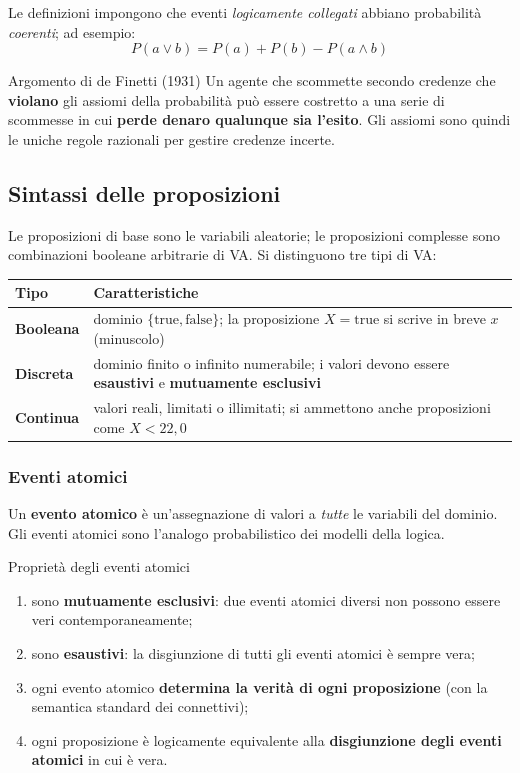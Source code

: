 \documentclass[11pt, a4paper]{article}
\renewcommand{\emph}[1]{\textcolor{verdechiaro}{\itshape #1}}
\newcommand{\intest}[1]{\textcolor{verde}{\sffamily\bfseries #1}}
\begin{document}
Le definizioni impongono che eventi \emph{logicamente collegati} abbiano probabilità \emph{coerenti}; ad esempio:
\[
  P(a \lor b) = P(a) + P(b) - P(a \land b)
\]

\begin{chiave}{Argomento di de Finetti (1931)}
  Un agente che scommette secondo credenze che \textbf{violano} gli assiomi della probabilità può essere costretto a una serie di scommesse in cui \textbf{perde denaro qualunque sia l'esito}. Gli assiomi sono quindi le uniche regole razionali per gestire credenze incerte.
\end{chiave}

\subsection{Sintassi delle proposizioni}

Le proposizioni di base sono le variabili aleatorie; le proposizioni complesse sono combinazioni booleane arbitrarie di VA. Si distinguono tre tipi di VA:

\begin{center}
  \renewcommand{\arraystretch}{1.35}
  \begin{tabular}{>{\bfseries}l p{10.6cm}}
    \toprule
    \intest{Tipo} & \intest{Caratteristiche} \\
    \midrule
    Booleana & dominio $\{\text{true}, \text{false}\}$; la proposizione $X = \text{true}$ si scrive in breve $x$ (minuscolo) \\
    Discreta & dominio finito o infinito numerabile; i valori devono essere \textbf{esaustivi} e \textbf{mutuamente esclusivi} \\
    Continua & valori reali, limitati o illimitati; si ammettono anche proposizioni come $X < 22{,}0$ \\
    \bottomrule
  \end{tabular}
\end{center}

\subsubsection*{Eventi atomici}

Un \textbf{evento atomico} è un'assegnazione di valori a \emph{tutte} le variabili del dominio. Gli eventi atomici sono l'analogo probabilistico dei modelli della logica.

\begin{proprietà}{Proprietà degli eventi atomici}
  \begin{enumerate}
    \item sono \textbf{mutuamente esclusivi}: due eventi atomici diversi non possono essere veri contemporaneamente;
    \item sono \textbf{esaustivi}: la disgiunzione di tutti gli eventi atomici è sempre vera;
    \item ogni evento atomico \textbf{determina la verità di ogni proposizione} (con la semantica standard dei connettivi);
    \item ogni proposizione è logicamente equivalente alla \textbf{disgiunzione degli eventi atomici} in cui è vera.
  \end{enumerate}
\end{proprietà}
\end{document}
